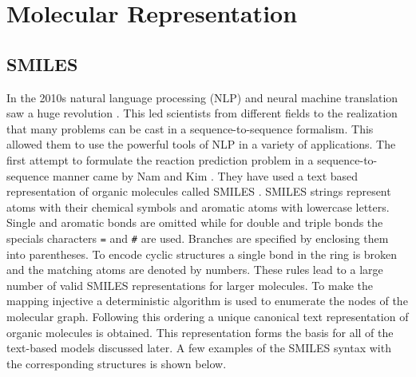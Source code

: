 \section{Molecular Representation}

\subsection{SMILES}
In the 2010s natural language processing (NLP) and neural machine translation saw a huge revolution \cite{Young2018RecentProcessing}. This led scientists from different fields to the realization that many problems can be cast in a sequence-to-sequence formalism. This allowed them to use the powerful tools of NLP in a variety of applications. The first attempt to formulate the reaction prediction problem in a sequence-to-sequence manner came by Nam and Kim \cite{Nam2016LinkingReactions}. They have used a text based representation of organic molecules called SMILES \cite{Weininger1988, Weininger1989}. SMILES strings represent atoms with their chemical symbols and aromatic atoms with lowercase letters. Single and aromatic bonds are omitted while for double and triple bonds the specials characters \texttt{=} and \texttt{\#} are used. Branches are specified by enclosing them into parentheses. To encode cyclic structures a single bond in the ring is broken and the matching atoms are denoted by numbers. These rules lead to a large number of valid SMILES representations for larger molecules. To make the mapping injective a deterministic algorithm is used to enumerate the nodes of the molecular graph. Following this ordering a unique canonical text representation of organic molecules is obtained. This representation forms the basis for all of the text-based models discussed later. 
A few examples of the SMILES syntax with the corresponding structures is shown below. 

